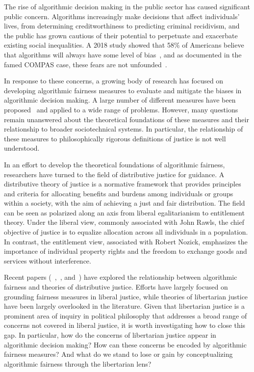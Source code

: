 
The rise of algorithmic decision making in the public sector has caused
significant public concern. Algorithms increasingly make decisions that affect
individuals' lives, from determining creditworthiness to predicting criminal 
recidivism, and the public has grown cautious of their potential to perpetuate
and exacerbate existing social inequalities. A 2018 study showed that 58\% of
Americans believe that algorithms will always have some level of
bias~\citep{Smith_2018}, and as documented in the famed COMPAS case, these fears
are not unfounded~\citep{Angwin_2016}.

In response to these concerns, a growing body of research has focused on
developing algorithmic fairness measures to evaluate and mitigate the biases
in algorithmic decision making. A large number of different measures have been
proposed~\citep{CorbettDavies_2023} and applied to a wide range of problems.
However, many questions remain unanswered about the theoretical foundations of
these measures and their relationship to broader sociotechnical systems. In
particular, the relationship of these measures to philosophically rigorous
definitions of justice is not well understood.

In an effort to develop the theoretical foundations of algorithmic fairness,
researchers have turned to the field of distributive justice for guidance.
A distributive theory of justice is a normative framework that provides
principles and criteria for allocating benefits and burdens among individuals or
groups within a society, with the aim of achieving a just and fair distribution.
The field can be seen as polarized along an axis from liberal egalitarianism to
entitlement theory. Under the liberal view, commonly associated with John Rawls, 
the chief objective of justice is to equalize allocation across all individuals
in a population. In contrast, the entitlement view, associated with Robert
Nozick, emphasizes the importance of individual property rights and the freedom
to exchange goods and services without interference. 

Recent papers (~\citep{Binns_2018},~\citep{Hertweck_2024}, and~\citep{Kuppler_2021})
have explored the relationship between algorithmic fairness and theories of
distributive justice. Efforts have largely focused on grounding fairness
measures in liberal justice, while theories of libertarian justice have been
largely overlooked in the literature. Given that libertarian justice is a
prominent area of inquiry in political philosophy that addresses a broad range
of concerns not covered in liberal justice, it is worth investigating how to
close this gap. In particular, how do the concerns of libertarian justice appear
in algorithmic decision making? How can these concerns be encoded by algorithmic
fairness measures? And what do we stand to lose or gain by conceptualizing
algorithmic fairness through the libertarian lens?

